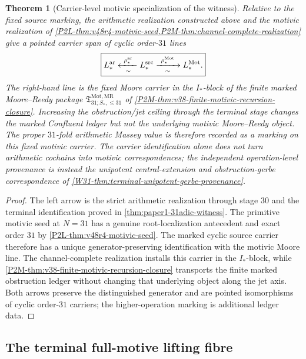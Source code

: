 \documentclass[11pt]{article}
\newtheorem{theorem}{Theorem}[section]
\theoremstyle{remark}
\newcommand{\Mot}{\mathrm{Mot}}
\newcommand{\MR}{\mathrm{MR}}
\begin{document}
\begin{theorem}[Carrier-level motivic specialization of the witness]
\label{W31-thm:common-source-motivic-span}
Relative to the fixed source marking, the arithmetic realization constructed
above and the motivic realization of
\cref{P2L-thm:v48r4-motivic-seed,P2M-thm:channel-complete-realization}
give a pointed carrier span of cyclic order-\(31\) lines
\[
 \boxed{
 L_*^{\rm ar}
 \xleftarrow[\sim]{\ \rho_*^{\rm ar}\ }
 L_*^{\rm src}
 \xrightarrow[\sim]{\ \rho_*^{\Mot}\ }
 L_*^{\Mot}.}
\]
The right-hand line is the fixed Moore carrier in the \(I_*\)-block of the
finite marked Moore--Reedy package
\(\mathfrak T^{\Mot,\MR}_{31;S_*,\le31}\) of
\cref{P2M-thm:v38-finite-motivic-recursion-closure}.  Increasing the
obstruction/jet ceiling through the terminal stage changes the marked
Confluent ledger but not the underlying motivic Moore--Reedy object.
The proper \(31\)-fold arithmetic Massey value is therefore recorded as a
marking on this fixed motivic carrier.  The carrier identification alone does
not turn arithmetic cochains into motivic correspondences; the independent
operation-level provenance is instead the unipotent central-extension and
obstruction-gerbe correspondence of
\cref{W31-thm:terminal-unipotent-gerbe-provenance}.
\end{theorem}

\begin{proof}
The left arrow is the strict arithmetic realization through stage \(30\) and
the terminal identification proved in
\cref{thm:paper1-31adic-witness}.  The primitive motivic seed at \(N=31\)
has a genuine root-localization antecedent and exact order \(31\) by
\cref{P2L-thm:v48r4-motivic-seed}.  The marked cyclic source carrier therefore
has a unique generator-preserving identification with the motivic Moore line.
The channel-complete realization installs this carrier in the \(I_*\)-block,
while \cref{P2M-thm:v38-finite-motivic-recursion-closure} transports the finite
marked obstruction ledger without changing that underlying object along the
jet axis.  Both arrows preserve the distinguished generator and are pointed
isomorphisms of cyclic order-\(31\) carriers; the higher-operation marking is
additional ledger data.
\end{proof}

\subsection{The terminal full-motive lifting fibre}
\end{document}
